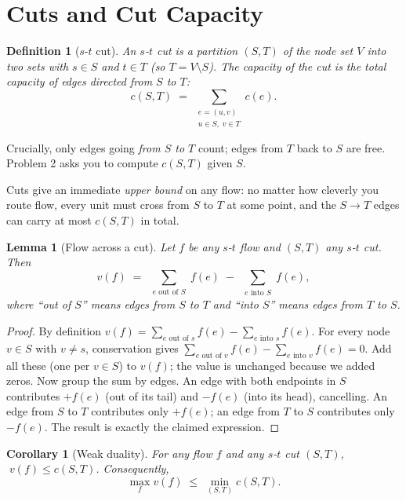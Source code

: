\documentclass[11pt]{article}
\newtheorem{lemma}[theorem]{Lemma}
\newtheorem{corollary}[theorem]{Corollary}
\newtheorem{definition}[theorem]{Definition}
\begin{document}
\section{Cuts and Cut Capacity}

\begin{definition}[$s$-$t$ cut]
An \emph{$s$-$t$ cut} is a partition $(S, T)$ of the node set $V$ into two sets with
$s \in S$ and $t \in T$ (so $T = V \setminus S$). The \emph{capacity} of the cut is the
total capacity of edges directed from $S$ to $T$:
\[
    c(S, T) \;=\; \sum_{\substack{e = (u,v) \\ u \in S,\; v \in T}} c(e).
\]
\end{definition}

Crucially, only edges going \emph{from $S$ to $T$} count; edges from $T$ back to $S$ are
free. Problem 2 asks you to compute $c(S,T)$ given $S$.

Cuts give an immediate \emph{upper bound} on any flow: no matter how cleverly you route
flow, every unit must cross from $S$ to $T$ at some point, and the $S \to T$ edges can
carry at most $c(S,T)$ in total.

\begin{lemma}[Flow across a cut]
\label{lem:flow-across-cut}
Let $f$ be any $s$-$t$ flow and $(S,T)$ any $s$-$t$ cut. Then
\[
    v(f) \;=\; \sum_{\substack{e \text{ out of } S}} f(e) \;-\; \sum_{\substack{e \text{ into } S}} f(e),
\]
where ``out of $S$'' means edges from $S$ to $T$ and ``into $S$'' means edges from $T$
to $S$.
\end{lemma}

\begin{proof}
By definition $v(f) = \sum_{e\text{ out of }s} f(e) - \sum_{e\text{ into }s} f(e)$. For
every node $v \in S$ with $v \ne s$, conservation gives
$\sum_{e\text{ out of }v} f(e) - \sum_{e\text{ into }v} f(e) = 0$. Add all these (one per
$v \in S$) to $v(f)$; the value is unchanged because we added zeros. Now group the sum by
edges. An edge with both endpoints in $S$ contributes $+f(e)$ (out of its tail) and
$-f(e)$ (into its head), cancelling. An edge from $S$ to $T$ contributes only $+f(e)$; an
edge from $T$ to $S$ contributes only $-f(e)$. The result is exactly the claimed
expression.
\end{proof}

\begin{corollary}[Weak duality]
\label{cor:weak-duality}
For any flow $f$ and any $s$-$t$ cut $(S,T)$, $\;v(f) \le c(S,T)$. Consequently,
\[
    \max_f v(f) \;\le\; \min_{(S,T)} c(S,T).
\]
\end{corollary}
\end{document}
